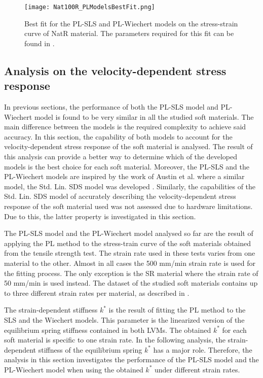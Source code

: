 \begin{figure}[H]
	\centering
	\texttt{[image: Nat100R\_PLModelsBestFit.png]}
	\caption{Best fit for the PL-SLS and PL-Wiechert models on the stress-strain curve of NatR material. The parameters required for this fit can be found in .}
	\label{fig:BestFitNat100R}
\end{figure}


\subsection{Analysis on the velocity-dependent stress response} \label{VelocityAnalysis}

In previous sections, the performance of both the PL-SLS model and PL-Wiechert model is found to be very similar in all the studied soft materials. The main difference between the models is the required complexity to achieve said accuracy. In this section, the capability of both models to account for the velocity-dependent stress response of the soft material is analysed. The result of this analysis can provide a better way to determine which of the developed models is the best choice for each soft material. Moreover, the PL-SLS and the PL-Wiechert models are inspired by the work of Austin et al. where a similar model, the Std. Lin. SDS model was developed \cite{austin2015control}. Similarly, the capabilities of the Std. Lin. SDS model of accurately describing the velocity-dependent stress response of the soft material used was not assessed due to hardware limitations. Due to this, the latter property is investigated in this section. 

The PL-SLS model and the PL-Wiechert model analysed so far are the result of applying the PL method to the stress-train curve of the soft materials obtained from the tensile strength test. The strain rate used in these tests varies from one material to the other. Almost in all cases the 500 mm/min strain rate is used for the fitting process. The only exception is the SR material where the strain rate of 50 mm/min is used instead. The dataset of the studied soft materials contains up to three different strain rates per material, as described in . 

The strain-dependent stiffness $k^*$ is the result of fitting the PL method to the SLS and the Wiechert models. This parameter is the linearized version of the equilibrium spring stiffness contained in both LVMs. The obtained $k^*$ for each soft material is specific to one strain rate. In the following analysis, the strain-dependent stiffness of the equilibrium spring $k^*$ has a major role. Therefore, the analysis in this section investigates the performance of the PL-SLS model and the PL-Wiechert model when using the obtained $k^*$ under different strain rates.

